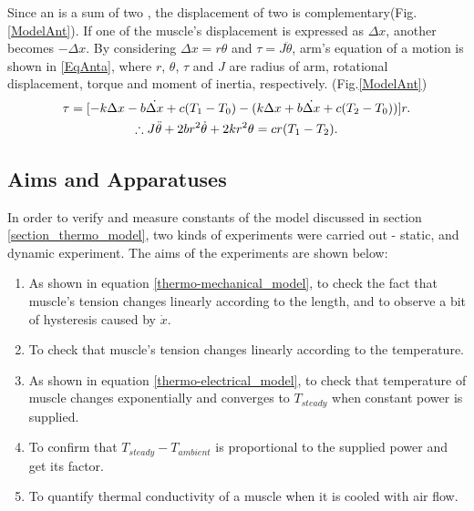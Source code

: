 Since an \anta is a sum of two \scpsnospace, the displacement of two \scps is complementary(Fig.\ref{ModelAnt}). If one of the muscle's displacement is expressed as $\Delta{x}$, another becomes $-\Delta{x}$. By considering $\Delta{x}=r\theta$ and $\tau=J\ddot{\theta}$, arm's equation of a motion is shown in \eqref{EqAnta}, where $r$, $\theta$, $\tau$ and $J$ are radius of arm, rotational displacement, torque and moment of inertia, respectively.
(Fig.\ref{ModelAnt})
\begin{gather}
\tau = [-k\Delta x-b\dot{\Delta x}+c(T_1-T_0) - (k\Delta x+b\dot{\Delta x}+c(T_2-T_0))]r. \notag \\
\therefore J\ddot{\theta}+2br^2\dot{\theta}+2kr^2\theta = cr(T_1-T_2). \label{EqAnta}
\end{gather}

\subsection{Aims and Apparatuses}\label{section_aimsappa}
In order to verify and measure constants of the model discussed in section \ref{section_thermo_model}, two kinds of experiments were carried out - static, and dynamic experiment. The aims of the experiments are shown below:

\begin{enumerate} 
\item As shown in equation \eqref{thermo-mechanical_model}, to check the fact that muscle's tension changes linearly according to the length, and to observe a bit of hysteresis caused by $\dot{x}$.
\item To check that muscle's tension changes linearly according to the temperature.
\item As shown in equation \eqref{thermo-electrical_model}, to check that temperature of muscle changes exponentially and converges to $T_{steady}$ when constant power is supplied.
\item To confirm that $T_{steady}-T_{ambient}$ is proportional to the supplied power and get its factor. 
\item To quantify thermal conductivity of a muscle when it is cooled with air flow.
\end{enumerate}

